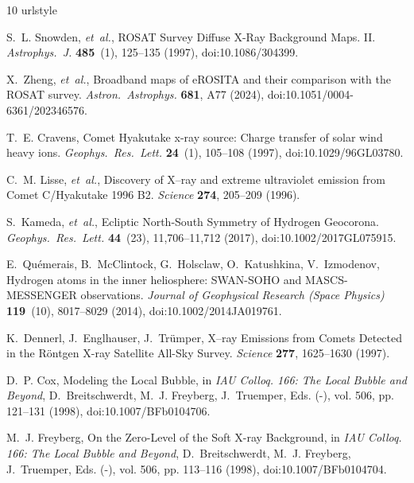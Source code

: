 \documentclass[12pt]{article}
\newcommand*\aap{Astron.~Astrophys.}
\newcommand*\apj{Astrophys.~J.}
\newcommand*\grl{Geophys.~Res.~Lett.}
\begin{document}
\begin{thebibliography}{10}
\providecommand{\url}[1]{\texttt{#1}}
\expandafter\ifx\csname urlstyle\endcsname\relax
  \providecommand{\doi}[1]{doi:\discretionary{}{}{}#1}\else
  \providecommand{\doi}{doi:\discretionary{}{}{}\begingroup
  \urlstyle{rm}\Url}\fi

S.~L. {Snowden}, \emph{et~al.}, {ROSAT Survey Diffuse X-Ray Background Maps.
  II.} \emph{\apj} \textbf{485}~(1), 125--135 (1997), \doi{10.1086/304399}.

X.~{Zheng}, \emph{et~al.}, {Broadband maps of eROSITA and their comparison with
  the ROSAT survey}. \emph{\aap} \textbf{681}, A77 (2024),
  \doi{10.1051/0004-6361/202346576}.

T.~E. {Cravens}, {Comet Hyakutake x-ray source: Charge transfer of solar wind
  heavy ions}. \emph{\grl} \textbf{24}~(1), 105--108 (1997),
  \doi{10.1029/96GL03780}.

C.~M. {Lisse}, \emph{et~al.}, {Discovery of X--ray and extreme ultraviolet
  emission from Comet C/Hyakutake 1996 B2}. \emph{Science} \textbf{274},
  205--209 (1996).

S.~{Kameda}, \emph{et~al.}, {Ecliptic North-South Symmetry of Hydrogen
  Geocorona}. \emph{\grl} \textbf{44}~(23), 11,706--11,712 (2017),
  \doi{10.1002/2017GL075915}.

E.~{Qu{\'e}merais}, B.~{McClintock}, G.~{Holsclaw}, O.~{Katushkina},
  V.~{Izmodenov}, {Hydrogen atoms in the inner heliosphere: SWAN-SOHO and
  MASCS-MESSENGER observations}. \emph{Journal of Geophysical Research (Space
  Physics)} \textbf{119}~(10), 8017--8029 (2014), \doi{10.1002/2014JA019761}.

K.~Dennerl, J.~Englhauser, J.~Tr\"umper, {X--ray Emissions from Comets Detected
  in the R\"ontgen X-ray Satellite All-Sky Survey}. \emph{Science}
  \textbf{277}, 1625--1630 (1997).

D.~P. {Cox}, {Modeling the Local Bubble}, in \emph{IAU Colloq. 166: The Local
  Bubble and Beyond}, D.~{Breitschwerdt}, M.~J. {Freyberg}, J.~{Truemper}, Eds.
  (-), vol. 506, pp. 121--131 (1998), \doi{10.1007/BFb0104706}.

M.~J. {Freyberg}, {On the Zero-Level of the Soft X-ray Background}, in
  \emph{IAU Colloq. 166: The Local Bubble and Beyond}, D.~{Breitschwerdt},
  M.~J. {Freyberg}, J.~{Truemper}, Eds. (-), vol. 506, pp. 113--116 (1998),
  \doi{10.1007/BFb0104704}.


\end{thebibliography}
\end{document}
